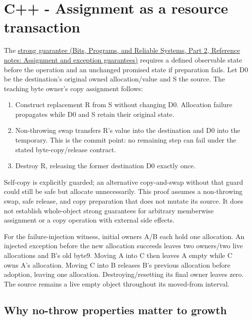\section{C++ - Assignment as a resource transaction}\label{01-foundations-i-ch010-c---assignment-as-a-resource-transaction}

\hypertarget{01-foundations-i-ch010-c---assignment-as-a-resource-transaction}{}

The \href{../01-Bits-Programs-and-Reliable-Systems-P02/main.pdf\#nameddest=appendix-bea6beb5350f}{strong guarantee (Bits, Programs, and Reliable Systems, Part 2, Reference notes: Assignment and exception guarantees)} requires a defined observable state before the operation and an unchanged promised state if preparation fails. Let D0 be the destination's original owned allocation/value and S the source. The teaching byte owner's copy assignment follows:

\begin{enumerate}
\def\labelenumi{\arabic{enumi}.}
\tightlist
\item
  Construct replacement R from S without changing D0. Allocation failure propagates while D0 and S retain their original state.
\item
  Non-throwing swap transfers R's value into the destination and D0 into the temporary. This is the commit point: no remaining step can fail under the stated byte-copy/release contract.
\item
  Destroy R, releasing the former destination D0 exactly once.
\end{enumerate}

Self-copy is explicitly guarded; an alternative copy-and-swap without that guard could still be safe but allocate unnecessarily. This proof assumes a non-throwing swap, safe release, and copy preparation that does not mutate its source. It does not establish whole-object strong guarantees for arbitrary memberwise assignment or a copy operation with external side effects.

For the failure-injection witness, initial owners A/B each hold one allocation. An injected exception before the new allocation succeeds leaves two owners/two live allocations and B's old byte9. Moving A into C then leaves A empty while C owns A's allocation. Moving C into B releases B's previous allocation before adoption, leaving one allocation. Destroying/resetting its final owner leaves zero. The source remains a live empty object throughout its moved-from interval.

\subsection{Why no-throw properties matter to growth}\label{01-foundations-i-ch010-why-no-throw-properties-matter-to-growth}

